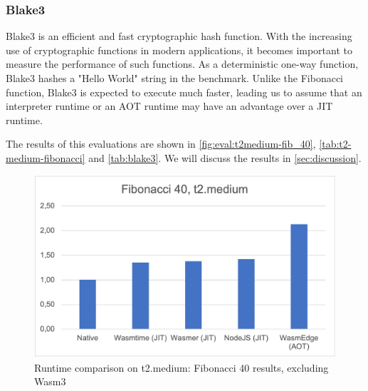 \subsubsection{Blake3}

Blake3 is an efficient and fast cryptographic hash function. With the increasing use of cryptographic functions in modern applications, it becomes important to measure the performance of such functions. As a deterministic one-way function, Blake3 hashes a "Hello World" string in the benchmark. Unlike the Fibonacci function, Blake3 is expected to execute much faster, leading us to assume that an interpreter runtime or an AOT runtime may have an advantage over a JIT runtime. 

The results of this evaluations are shown in \autoref{fig:eval:t2medium-fib_40}, \autoref{tab:t2-medium-fibonacci} and \autoref{tab:blake3}. We will discuss the results in \autoref{sec:discussion}.

\begin{figure}[htbp]
    \centering
        \includegraphics[width=1\linewidth]{images/benches/t2medium_fib_40.png}
    \caption{Runtime comparison on t2.medium: Fibonacci 40 results, excluding Wasm3}
    \label{fig:eval:t2medium-fib_40}
\end{figure}

